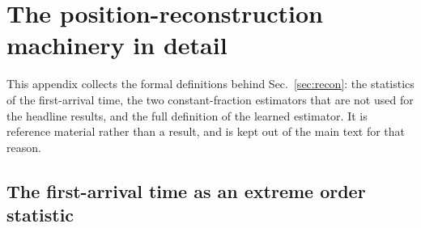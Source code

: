 \documentclass[11pt,a4paper]{article}
\begin{document}
\section{The position-reconstruction machinery in detail}
\label{app:recon}

This appendix collects the formal definitions behind
Sec.~\ref{sec:recon}: the statistics of the first-arrival time, the two
constant-fraction estimators that are not used for the headline results, and
the full definition of the learned estimator.  It is reference material
rather than a result, and is kept out of the main text for that reason.

\subsection{The first-arrival time as an extreme order statistic}
\label{app:recon-timewalk}
\end{document}
